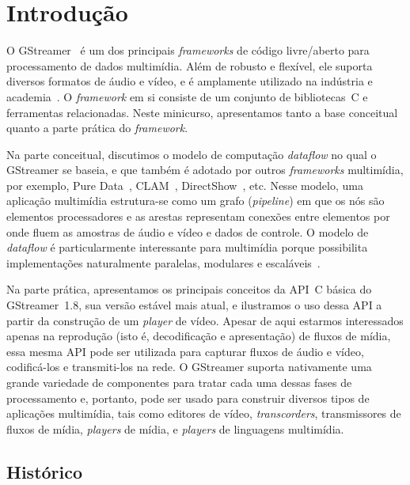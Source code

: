 \documentclass{SBCbookchapter}
\begin{document}

\section{Introdução}
\label{sc:intro}

O GStreamer~\cite{gstreamer} é um dos principais \emph{frameworks} de código
livre/aberto para processamento de dados multimídia.  Além de robusto e
flexível, ele suporta diversos formatos de áudio e vídeo, e é amplamente
utilizado na indústria e academia~\cite{gstreamer-apps}.  O \emph{framework}
em si consiste de um conjunto de bibliotecas~C e ferramentas relacionadas.
Neste minicurso, apresentamos tanto a base conceitual quanto a parte prática
do \emph{framework}.

Na parte conceitual, discutimos o modelo de computação \emph{dataflow} no
qual o GStreamer se baseia, e que também é adotado por outros
\emph{frameworks} multimídia, por exemplo, Pure
Data~\cite{Puckette-M-S-2007}, CLAM~\cite{Amatriain-X-2008},
DirectShow~\cite{Chatterjee-A-1997}, etc.  Nesse modelo, uma aplicação
multimídia estrutura-se como um grafo (\emph{pipeline}) em que os nós são
elementos processadores e as arestas representam conexões entre elementos
por onde fluem as amostras de áudio e vídeo e dados de controle.  O modelo
de \emph{dataflow} é particularmente interessante para multimídia porque
possibilita implementações naturalmente paralelas, modulares e
escaláveis~\cite{Yviquel-H-2014}.

Na parte prática, apresentamos os principais conceitos da API~C básica do
GStreamer~1.8, sua versão estável mais atual, e ilustramos o uso dessa API a
partir da construção de um \emph{player} de vídeo.  Apesar de aqui estarmos
interessados apenas na reprodução (isto é, decodificação e apresentação) de
fluxos de mídia, essa mesma API pode ser utilizada para capturar fluxos de
áudio e vídeo, codificá-los e transmiti-los na rede.  O GStreamer suporta
nativamente uma grande variedade de componentes para tratar cada uma dessas
fases de processamento e, portanto, pode ser usado para construir diversos
tipos de aplicações multimídia, tais como editores de vídeo,
\emph{transcorders}, transmissores de fluxos de mídia, \emph{players} de
mídia, e \emph{players} de linguagens multimídia.



\subsection*{Histórico}
\end{document}
